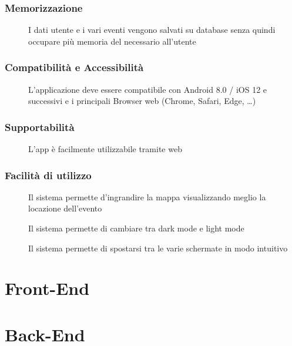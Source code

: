 \documentclass{article}
\let\origthesubsubsection\thesubsubsection
\begin{document}
\subsubsection{Memorizzazione} \label{rnf_5}
\begin{description}
    \item[] I dati utente e i vari eventi vengono salvati su database senza quindi occupare più memoria del necessario all'utente
\end{description}
\subsubsection{Compatibilità e Accessibilità} \label{rnf_6}
\begin{description}
    \item[] L’applicazione deve essere compatibile con Android 8.0 / iOS 12 e successivi e i principali Browser web (Chrome, Safari, Edge, \dots)
\end{description}
\subsubsection{Supportabilità} \label{rnf_7}
\begin{description}
    \item[] L'app è facilmente utilizzabile tramite web
\end{description}
\subsubsection{Facilità di utilizzo} \label{rnf_8}
\begin{description}
    \item[] Il sistema permette d'ingrandire la mappa visualizzando meglio la locazione dell'evento
    \item[] Il sistema permette di cambiare tra dark mode e light mode
    \item[] Il sistema permette di spostarsi tra le varie schermate in modo intuitivo
\end{description}
\renewcommand\thesubsubsection{\origthesubsubsection}
\clearpage
\section{Front-End}
\begin{description}
    \item[]
\end{description}
\clearpage
\section{Back-End}
\begin{description}
    \item[]
\end{description}
\end{document}
